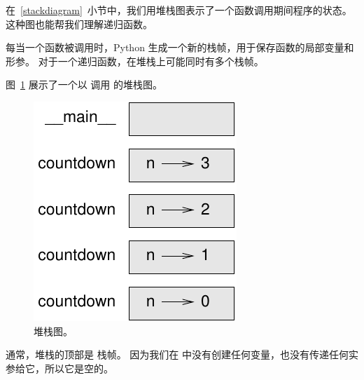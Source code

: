 {{{{    
    



在~\ref{stackdiagram}~小节中，我们用堆栈图表示了一个函数调用期间程序的状态。
这种图也能帮我们理解递归函数。


每当一个函数被调用时，Python 生成一个新的栈帧，用于保存函数的局部变量和形参。
对于一个递归函数，在堆栈上可能同时有多个栈帧。


图~\ref{fig.stack2} 展示了一个以  调用  的堆栈图。

\begin{figure}
\centerline
{\includegraphics[scale=0.8]{../source/figs/stack2.pdf}}
\caption{堆栈图。}
\label{fig.stack2}
\end{figure}


  

通常，堆栈的顶部是  栈帧。
因为我们在  中没有创建任何变量，也没有传递任何实参给它，所以它是空的。

}}}}

